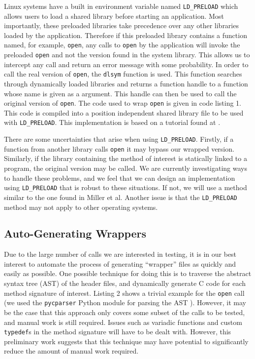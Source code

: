\documentclass[10pt]{article}
\begin{document}
Linux systems have a built in environment variable named \texttt{LD\_PRELOAD} which allows users to load a shared library before starting an application. Most importantly, these preloaded libraries take precedence over any other libraries loaded by the application. Therefore if this preloaded library contains a function named, for example, \texttt{open}, any calls to \texttt{open} by the application will invoke the preloaded \texttt{open} and not the version found in the system library. This allows us to intercept any call and return an error message with some probability. In order to call the real version of \texttt{open}, the \texttt{dlsym} function is used. This function searches through dynamically loaded libraries and returns a function handle to a function whose name is given as a argument. This handle can then be used to call the original version of \texttt{open}. The code used to wrap \texttt{open} is given in code listing 1. This code is compiled into a position independent shared library file to be used with \texttt{LD\_PRELOAD}. This implementation is based on a tutorial found at \cite{preload}.

There are some uncertainties that arise when using \texttt{LD\_PRELOAD}. Firstly, if a function from another library calls \texttt{open} it may bypass our wrapped version. Similarly, if the library containing the method of interest is statically linked to a program, the original version may be called. We are currently investigating ways to handle these problems, and we feel that we can design an implementation using \texttt{LD\_PRELOAD} that is robust to these situations. If not, we will use a method similar to the one found in Miller et al. Another issue is that the \texttt{LD\_PRELOAD} method may not apply to other operating systems.

\subsection{Auto-Generating Wrappers}
Due to the large number of calls we are interested in testing, it is in our best interest to automate the process of generating ``wrapper'' files as quickly and easily as possible. One possible technique for doing this is to traverse the abstract syntax tree (AST) of the header files, and dynamically generate C code for each method signature of interest. Listing 2 shows a trivial example for the \texttt{open} call (we used the \texttt{pycparser} Python module for parsing the AST \cite{pycparser}). However, it may be the case that this approach only covers some subset of the calls to be tested, and manual work is still required. Issues such as variadic functions and custom \texttt{typedef}s in the method signature will have to be dealt with. However, this preliminary work suggests that this technique may have potential to significantly reduce the amount of manual work required.
\end{document}
